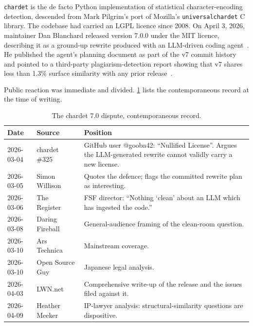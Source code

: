 \documentclass[11pt,letterpaper]{article}
\begin{document}
\texttt{chardet} is the de facto Python implementation of statistical
character-encoding detection, descended from Mark Pilgrim's port of
Mozilla's \texttt{universalchardet} C library. The codebase had carried
an LGPL licence since 2008. On April 3, 2026, maintainer Dan Blanchard
released version 7.0.0 under the MIT licence, describing it as a
ground-up rewrite produced with an LLM-driven coding
agent~\cite{lwn2026chardet,arstechnica2026chardet}. He published the
agent's planning document as part of the v7 commit history and pointed
to a third-party plagiarism-detection report showing that v7 shares
less than 1.3\% surface similarity with any prior
release~\cite{lwn2026chardet}.

Public reaction was immediate and divided. \cref{tab:dispute} lists
the contemporaneous record at the time of writing.

\begin{table}[h]
\small
\centering
\caption{The chardet 7.0 dispute, contemporaneous record.}
\label{tab:dispute}
\begin{tabular}{@{}llp{}@{}}
\toprule
Date & Source & Position \\
\midrule
2026-03-04 & chardet \#325~\cite{chardet325} &
  GitHub user @gooba42: ``Nullified License''. Argues the LLM-generated rewrite cannot validly carry a new license. \\
2026-03-05 & Simon Willison~\cite{willison2026chardet} &
  Quotes the defence; flags the committed rewrite plan as interesting. \\
2026-03-06 & The Register~\cite{theregister2026chardet} &
  FSF director: ``Nothing `clean' about an LLM which has ingested the code.'' \\
2026-03-08 & Daring Fireball~\cite{daringfireball2026chardet} &
  General-audience framing of the clean-room question. \\
2026-03-10 & Ars Technica~\cite{arstechnica2026chardet} &
  Mainstream coverage. \\
2026-03-10 & Open Source Guy~\cite{shujisado2026chardet} &
  Japanese legal analysis. \\
2026-04-03 & LWN.net~\cite{lwn2026chardet} &
  Comprehensive write-up of the release and the issues filed against it. \\
2026-04-09 & Heather Meeker~\cite{meeker2026chardet} &
  IP-lawyer analysis: structural-similarity questions are dispositive. \\
\bottomrule
\end{tabular}
\end{table}
\end{document}
